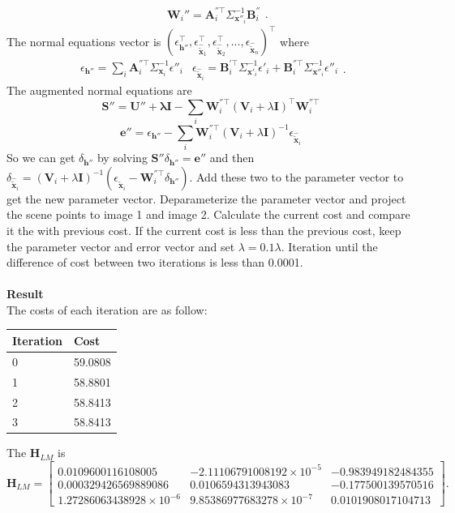 \documentclass{../../assignment}
\begin{document}
\begin{problemlist}
\begin{enumerate}
$$\begin{matrix}
& 
\mathbf{W}_i'' = \mathbf{A}_i^{''\top}\Sigma_{\mathbf{x}''_i}^{-1}  \mathbf{B}_i^{''} 
\end{matrix}.
$$
The normal equations vector is $(\epsilon_{\mathbf{h}''}^{\top},\epsilon_{\hat{\tilde{\mathbf{x}}}_1}^{\top},\epsilon_{\hat{\tilde{\mathbf{x}}}_2}^{\top},...,\epsilon_{\hat{\tilde{\mathbf{x}}}_n})^{\top}$
where
$$
\begin{matrix}
\epsilon_{\mathbf{h}''} = \sum_i \mathbf{A}_i^{''\top}\Sigma_{\mathbf{x}_i}^{-1}  \epsilon''_i
&
\epsilon_{\hat{\tilde{\mathbf{x}}}_i} = \mathbf{B}_i^{'\top}\Sigma_{\mathbf{x}'_i}^{-1}  \epsilon'_i + \mathbf{B}_i^{''\top}\Sigma_{\mathbf{x}''_i}^{-1}  \epsilon''_i
\end{matrix}.
$$
The augmented normal equations are
$$
\mathbf{S}''=\mathbf{U''+\lambda I}-\sum_i \mathbf{W}_i^{''\top}(\mathbf{V}_i+\lambda \mathbf{I})^{\top}\mathbf{W}_i^{''\top}
$$
$$
\mathbf{e}''= \epsilon_{\mathbf{h}''} - \sum_i \mathbf{W}_i^{''\top}(\mathbf{V}_i+\lambda \mathbf{I})^{-1} \epsilon_{\hat{\tilde{\mathbf{x}}}_i}
$$
So we can get $\delta_{\mathbf{h}''}$ by solving $\mathbf{S}''\delta_{\mathbf{h}''} = \mathbf{e}''$ and then $\delta_{\hat{\tilde{\mathbf{x}}}_i} = (\mathbf{V}_i+\lambda \mathbf{I})^{-1}(\epsilon_{\hat{\tilde{\mathbf{x}}}_i} - \mathbf{W}_i^{''\top}\delta_{\mathbf{h}''})$. Add these two to the parameter vector to get the new parameter vector. Deparameterize the parameter vector and project the scene points to image 1 and image 2. Calculate the current cost and compare it the with previous cost. If the current cost is less than the previous cost, keep the parameter vector and error vector and set $\lambda = 0.1\lambda$. Iteration until the difference of cost between two iterations is less than 0.0001.
\\\\
\textbf{Result}\\
The costs of each iteration are as follow:
\begin{center}  
\begin{tabular}{|l|l|}
\hline
Iteration&Cost\\
\hline
0&59.0808\\
\hline 
1&58.8801\\
\hline 
2&58.8413\\
\hline
3&58.8413\\
\hline  
\end{tabular}
\end{center}
The $\mathbf{H}_{LM}$ is
\[
\mathbf{H}_{LM} = 
\begin{bmatrix}
0.0109600116108005  &  -2.11106791008192\times 10^{-5} & -0.983949182484355\\
0.000329426569889086 & 0.0106594313943083 & -0.177500139570516\\
1.27286063438928\times 10^{-6} &  9.85386977683278\times 10^{-7} & 0.0101908017104713
\end{bmatrix}.
\]

\end{enumerate}
\end{problemlist}
\end{document}
